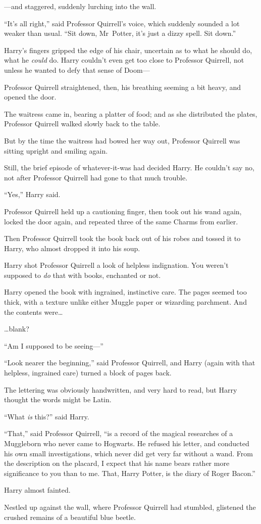 —and staggered, suddenly lurching into the wall.

“It’s all right,” said Professor Quirrell’s voice, which suddenly sounded a lot weaker than usual. “Sit down, Mr~Potter, it’s just a dizzy spell. Sit down.”

Harry’s fingers gripped the edge of his chair, uncertain as to what he should do, what he \emph{could} do. Harry couldn’t even get too close to Professor Quirrell, not unless he wanted to defy that sense of Doom—

Professor Quirrell straightened, then, his breathing seeming a bit heavy, and opened the door.

The waitress came in, bearing a platter of food; and as she distributed the plates, Professor Quirrell walked slowly back to the table.

But by the time the waitress had bowed her way out, Professor Quirrell was sitting upright and smiling again.

Still, the brief episode of whatever-it-was had decided Harry. He couldn’t say no, not after Professor Quirrell had gone to that much trouble.

“Yes,” Harry said.

Professor Quirrell held up a cautioning finger, then took out his wand again, locked the door again, and repeated three of the same Charms from earlier.

Then Professor Quirrell took the book back out of his robes and tossed it to Harry, who almost dropped it into his soup.

Harry shot Professor Quirrell a look of helpless indignation. You weren’t supposed to \emph{do} that with books, enchanted or not.

Harry opened the book with ingrained, instinctive care. The pages seemed too thick, with a texture unlike either Muggle paper or wizarding parchment. And the contents were…

…blank?

“Am I supposed to be seeing—”

“Look nearer the beginning,” said Professor Quirrell, and Harry (again with that helpless, ingrained care) turned a block of pages back.

The lettering was obviously handwritten, and very hard to read, but Harry thought the words might be Latin.

“What \emph{is} this?” said Harry.

“That,” said Professor Quirrell, “is a record of the magical researches of a Muggleborn who never came to Hogwarts. He refused his letter, and conducted his own small investigations, which never did get very far without a wand. From the description on the placard, I expect that his name bears rather more significance to you than to me. That, Harry Potter, is the diary of Roger Bacon.”

Harry almost fainted.

Nestled up against the wall, where Professor Quirrell had stumbled, glistened the crushed remains of a beautiful blue beetle.

